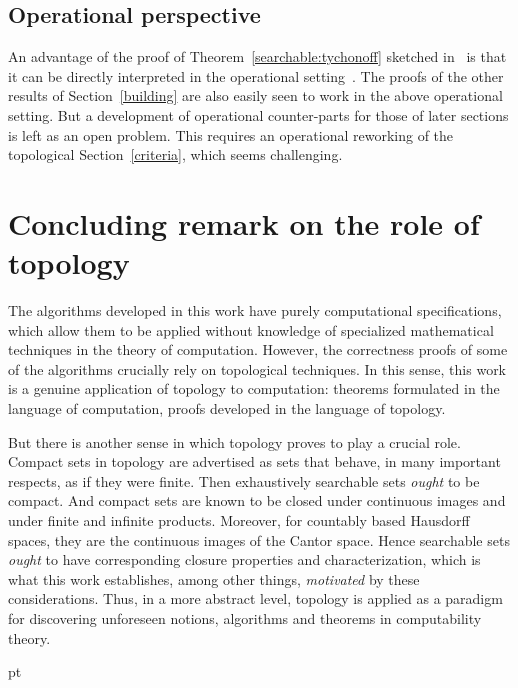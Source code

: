 \documentclass{LMCS}
\begin{document}
\subsection{Operational perspective}
An advantage of the proof of Theorem~\ref{searchable:tychonoff}
sketched in~\cite{escardo:lics07} is that it can be directly
interpreted in the operational
setting~\cite{escardo:barbados,escardo:ho}.  The proofs of the other
results of Section~\ref{building} are also easily seen to work in the
above operational setting.  But a development of operational
counter-parts for those of later sections is left as an open problem.
This requires an operational reworking of the topological
Section~\ref{criteria}, which seems challenging.

\section{Concluding remark on the role of topology} 
\label{conclusion}

The algorithms developed in this work have purely computational
specifications, which allow them to be applied without knowledge of
specialized mathematical techniques in the theory of computation.
However, the correctness proofs of some of the algorithms crucially
rely on topological techniques. In this sense, this work is a genuine
application of topology to computation: theorems formulated in the
language of computation, proofs developed in the language of topology.

But there is another sense in which topology proves to play a crucial
role.  Compact sets in topology are advertised as sets that behave, in
many important respects, as if they were finite.  Then exhaustively
searchable sets \emph{ought} to be compact.  And compact sets are
known to be closed under continuous images and under finite and
infinite products.  Moreover, for countably based Hausdorff spaces,
they are the continuous images of the Cantor space.  Hence searchable
sets \emph{ought} to have corresponding closure properties and
characterization, which is what this work establishes, among other
things, \emph{motivated} by these considerations.  Thus, in a more
abstract level, topology is applied as a paradigm for discovering
unforeseen notions, algorithms and theorems in computability theory.




\nocite{smyth:topology}



 pt
\end{document}
